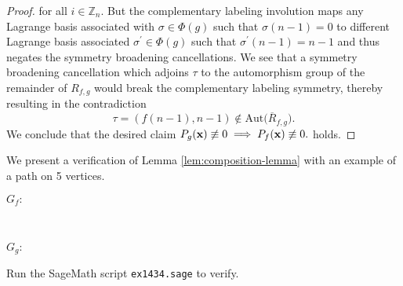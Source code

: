 \begin{proof}
for all $i\in\mathbb{Z}_{n}$. But the complementary labeling involution
maps any Lagrange basis associated with $\sigma\in\Phi(g) $
such that $\sigma\left(n-1\right)=0$ to different Lagrange basis
associated $\sigma^{\prime}\in\Phi(g) $
such that $\sigma^{\prime}\left(n-1\right)=n-1$ and thus negates
the symmetry broadening cancellations. We see that a symmetry
broadening cancellation which adjoins $\tau$ to the automorphism
group of the remainder of $R_{f,g}$ would break the
complementary labeling symmetry, thereby resulting in the contradiction
\[
\tau=\left(f(n-1),n-1\right)\not\in\text{Aut}\big(\overline{R}_{f,g}\big).
\]
We conclude that the desired claim $P_g ({\bf x}) \not\equiv 0  \implies  P_{f} ({\bf x}) \not\equiv 0.$
holds.
\end{proof}

\begin{example} We present a verification of Lemma \ref{lem:composition-lemma} with an example of a path on 5 vertices.
\ \\
\begin{center}   $G_f: \;$
\end{center}
\ \\
\begin{center}   
$G_g: \;$
\end{center}

Run the SageMath script \texttt{ex1434.sage} to verify.
\end{example}
